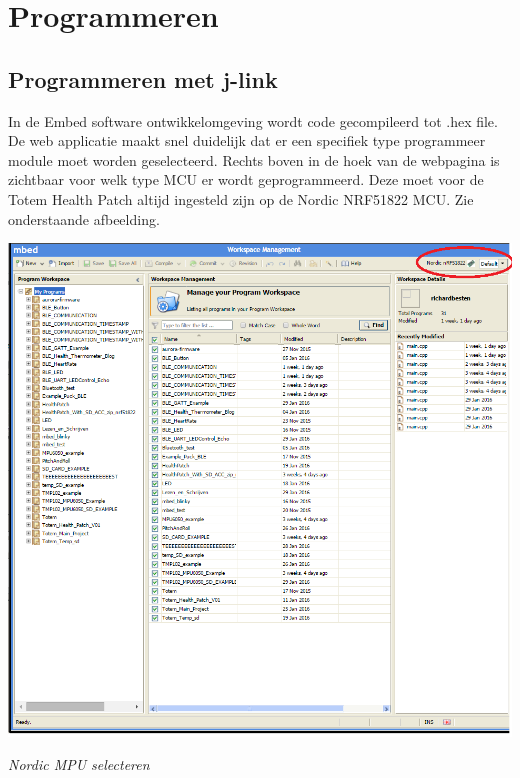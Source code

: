 \documentclass[conference]{IEEEtran}
\begin{document}
\section{Programmeren}
\subsection{Programmeren met j-link}
In de Embed software ontwikkelomgeving wordt code gecompileerd tot .hex file. De web applicatie maakt snel duidelijk dat er een specifiek type programmeer module moet worden geselecteerd. Rechts boven in de hoek van de webpagina is zichtbaar voor welk type MCU er wordt geprogrammeerd. Deze moet voor de Totem Health Patch altijd ingesteld zijn op de Nordic NRF51822 MCU. Zie onderstaande afbeelding.

\begin{center}
    \includegraphics[scale=0.4]{mbed2}
    \begin{minipage}{0.6\textwidth}
    \footnotesize
    \emph{Nordic MPU selecteren}
    \end{minipage}
\end{center}
\end{document}
